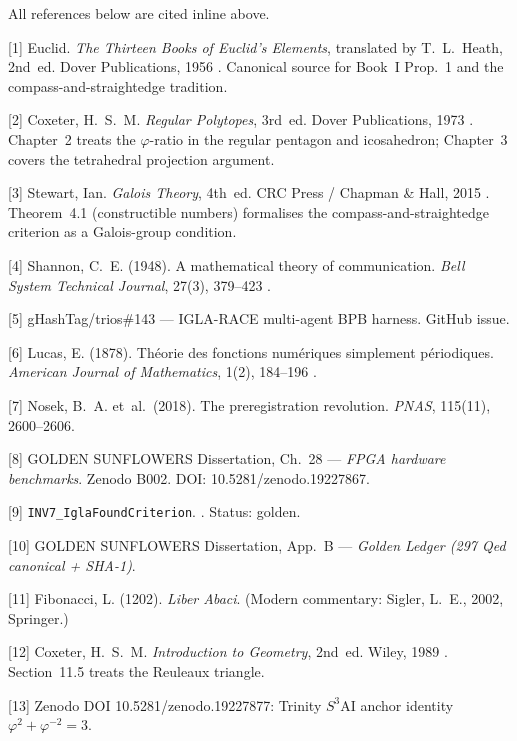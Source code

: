 \begin{refsection}
All references below are cited inline above.

[1] Euclid. \emph{The Thirteen Books of Euclid's Elements}, translated
by T.~L.~Heath, 2nd~ed.
Dover Publications, 1956 \cite{euclid_elements}.
Canonical source for Book~I Prop.~1 and the compass-and-straightedge
tradition.

[2] Coxeter, H.~S.~M.
\emph{Regular Polytopes}, 3rd~ed.
Dover Publications, 1973 \cite{coxeter_regular_polytopes}.
Chapter~2 treats the \(\varphi\)-ratio in the regular pentagon and
icosahedron; Chapter~3 covers the tetrahedral projection argument.

[3] Stewart, Ian. \emph{Galois Theory}, 4th~ed.
CRC Press / Chapman \& Hall, 2015 \cite{stewart_galois_theory}.
Theorem~4.1 (constructible numbers) formalises the
compass-and-straightedge criterion as a Galois-group condition.

[4] Shannon, C.~E. (1948).
A mathematical theory of communication.
\emph{Bell System Technical Journal}, 27(3), 379--423 \cite{shannon_mathematical}.

[5] gHashTag/trios\#143 --- IGLA-RACE multi-agent BPB harness.
GitHub issue.

[6] Lucas, E. (1878).
Théorie des fonctions numériques simplement périodiques.
\emph{American Journal of Mathematics}, 1(2), 184--196 \cite{lucas1878}.

[7] Nosek, B.~A. et~al.\ (2018).
The preregistration revolution.
\emph{PNAS}, 115(11), 2600--2606.

[8] GOLDEN SUNFLOWERS Dissertation, Ch.~28 ---
\emph{FPGA hardware benchmarks}. Zenodo B002.
DOI: 10.5281/zenodo.19227867.

[9] \texttt{INV7\_IglaFoundCriterion}.
.
Status: golden.

[10] GOLDEN SUNFLOWERS Dissertation, App.~B ---
\emph{Golden Ledger (297 Qed canonical + SHA-1)}.

[11] Fibonacci, L. (1202). \emph{Liber Abaci}.
(Modern commentary: Sigler, L.~E., 2002, Springer.)

[12] Coxeter, H.~S.~M.
\emph{Introduction to Geometry}, 2nd~ed.
Wiley, 1989 \cite{coxeter_intro_geometry}.
Section~11.5 treats the Reuleaux triangle.

[13] Zenodo DOI 10.5281/zenodo.19227877:
Trinity \(S^3\)AI anchor identity \(\varphi^2 + \varphi^{-2} = 3\).
\end{refsection}
